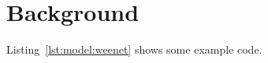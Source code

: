 \chapter{Background}
\label{ch:background}


Listing~\ref{lst:model:weenet} shows some example code.




